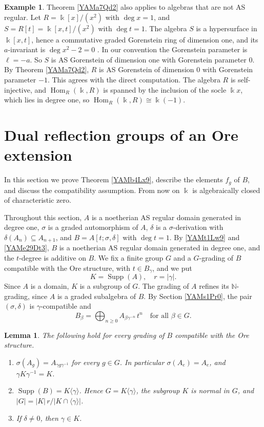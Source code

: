 \documentclass[reqno]{amsart}
\numberwithin{equation}{section}
\newtheorem{lemma}[equation]{Lemma}
\theoremstyle{definition}
\newtheorem{example}[equation]{Example}
\theoremstyle{remark}
\theoremstyle{plain}
\newcommand{\kk}{\Bbbk}
\DeclareMathOperator{\supp}{Supp}
\DeclareMathOperator{\Hom}{Hom}
\begin{document}
\begin{example}\label{YAMex17Gn1}
Theorem \ref{YAMa7Qd2} also applies to algebras that are not AS regular. Let $R=\kk[x]/(x^2)$ with $\deg x=1$, and $S=R[t]=\kk[x,t]/(x^2)$ with $\deg t=1$. The algebra $S$ is a hypersurface in $\kk[x,t]$, hence a commutative graded Gorenstein ring of dimension one, and its $a$-invariant is $\deg x^2-2=0$ \cite[\S3.6]{BH}. In our convention the Gorenstein parameter is $\ell=-a$. So $S$ is AS Gorenstein of dimension one with Gorenstein parameter $0$. By Theorem \ref{YAMa7Qd2}, $R$ is AS Gorenstein of dimension $0$ with Gorenstein parameter $-1$. This agrees with the direct computation. The algebra $R$ is self-injective, and $\Hom_R(\kk,R)$ is spanned by the inclusion of the socle $\kk x$, which lies in degree one, so $\Hom_R(\kk,R)\cong\kk(-1)$.
\end{example}


\section{Dual reflection groups of an Ore extension}\label{YAMs4Or0}

In this section we prove Theorem \ref{YAMb4Lx9}, describe the elements $f_g$ of $B$, and discuss the compatibility assumption. From now on $\kk$ is algebraically closed of characteristic zero.

Throughout this section, $A$ is a noetherian AS regular domain generated in degree one, $\sigma$ is a graded automorphism of $A$, $\delta$ is a $\sigma$-derivation with $\delta(A_n)\subseteq A_{n+1}$, and $B=A[t;\sigma,\delta]$ with $\deg t=1$. By \eqref{YAMt1Lw9} and \eqref{YAMe29Dt3}, $B$ is a noetherian AS regular domain generated in degree one, and the $t$-degree is additive on $B$. We fix a finite group $G$ and a $G$-grading of $B$ compatible with the Ore structure, with $t\in B_\gamma$, and we put
\[
K=\supp(A),\quad r=|\gamma|.
\]
Since $A$ is a domain, $K$ is a subgroup of $G$. The grading of $A$ refines its $\mathbb N$-grading, since $A$ is a graded subalgebra of $B$. By Section \ref{YAMs1Pr0}, the pair $(\sigma,\delta)$ is $\gamma$-compatible and
\begin{equation}\label{YAMe31Bc5}
B_\beta=\bigoplus_{n\ge0}A_{\beta\gamma^{-n}}\,t^n\quad\text{for all }\beta\in G.
\end{equation}

\begin{lemma}\label{YAMl4Ae9}
The following hold for every grading of $B$ compatible with the Ore structure.
\begin{enumerate}
\item $\sigma(A_g)=A_{\gamma g\gamma^{-1}}$ for every $g\in G$. In particular $\sigma(A_e)=A_e$, and $\gamma K\gamma^{-1}=K$.
\item $\supp(B)=K\langle\gamma\rangle$. Hence $G=K\langle\gamma\rangle$, the subgroup $K$ is normal in $G$, and $|G|=|K|\,r/|K\cap\langle\gamma\rangle|$.
\item If $\delta\neq0$, then $\gamma\in K$.
\end{enumerate}
\end{lemma}
\end{document}

